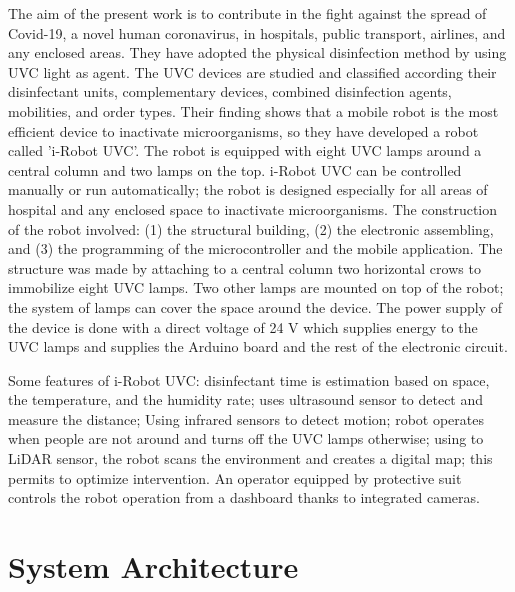 \documentclass[letterpaper]{article} %
\begin{document}
\cite{Guettari2020} The aim of the present work is to contribute in the fight against the spread of Covid-19, a novel human coronavirus, in hospitals, public transport, airlines, and any enclosed areas. They have adopted the physical disinfection method by using UVC light as agent. The UVC devices are studied and classified according their disinfectant units, complementary devices, combined disinfection agents, mobilities, and order types. Their finding shows that a mobile robot is the most efficient device to inactivate microorganisms, so they have developed a robot called 'i-Robot UVC'. The robot is equipped with eight UVC lamps around a central column and two lamps on the top. 
i-Robot UVC can be controlled manually or run automatically; the robot is designed especially for all areas of hospital and any enclosed space to inactivate microorganisms. The construction of the robot involved: (1) the structural building, (2) the electronic assembling, and (3) the programming of the microcontroller and the mobile application.
The structure was made by attaching to a central column two horizontal crows to immobilize eight UVC lamps. Two other lamps are mounted on top of the robot; the system of lamps can cover the space around the device. The power supply of the device is done with a direct voltage of 24 V which supplies energy to the UVC lamps and supplies the Arduino board and the rest of the electronic circuit.

Some features of i-Robot UVC:   disinfectant time is estimation based on space,  the temperature, and the humidity rate; uses ultrasound sensor to detect and measure the distance; Using infrared sensors  to detect motion;  robot operates when people are not around and turns off the UVC lamps otherwise; using  to LiDAR sensor, the robot scans the environment and creates a digital map; this permits to optimize intervention. An operator equipped by protective suit controls the robot operation from a dashboard thanks to integrated cameras.



\section{System Architecture}
\label{sec:SystemArchitecture}

\end{document}
